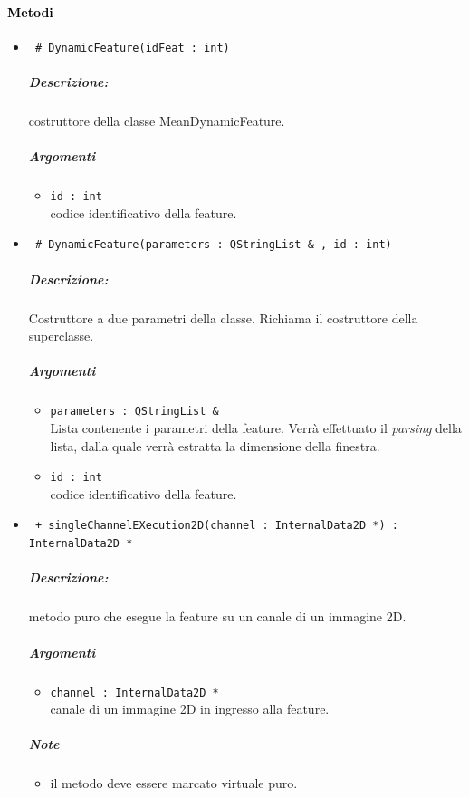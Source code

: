 \paragraph{\textcolor{black}{Metodi\\}}
	\begin{itemize}
	\item \color{blue}\verb! # DynamicFeature(idFeat : int)!
		\color{black}
		\subparagraph{Descrizione:} costruttore della classe MeanDynamicFeature.
		\subparagraph{Argomenti}
			\begin{itemize}
				\item \color{RoyalPurple} \verb!id : int! \\ 
				\color{black} codice identificativo della feature\g{}.	
			\end{itemize}
			
	\item \color{blue}\verb! # DynamicFeature(parameters : QStringList & , id : int)!
		\color{black}
		\subparagraph{Descrizione:} Costruttore a due parametri della classe. Richiama il costruttore della 						superclasse.
		\subparagraph{Argomenti}
			\begin{itemize}	
				\item \color{RoyalPurple} \verb!parameters : QStringList &! \\ 
				\color{black} Lista contenente i parametri della feature\g{}. Verrà effettuato il \textit{parsing} 						della lista, dalla quale verrà estratta la dimensione della finestra.
				\item \color{RoyalPurple} \verb!id : int! \\ 
				\color{black} codice identificativo della feature\g{}.	
			\end{itemize}

	\item \color{blue}\verb! + singleChannelEXecution2D(channel : InternalData2D *) : InternalData2D *!
		\color{black}
		\subparagraph{Descrizione:} metodo puro che esegue la feature su un canale di un immagine 2D.
		\subparagraph{Argomenti}
			\begin{itemize}
				\item \color{RoyalPurple} \verb!channel : InternalData2D * ! \\ 
				\color{black} canale di un immagine 2D in ingresso alla feature.		
			\end{itemize}
		\subparagraph{Note}
			\begin{itemize}
				\item il metodo deve essere marcato virtuale puro.
			\end{itemize}
			

\end{itemize}

